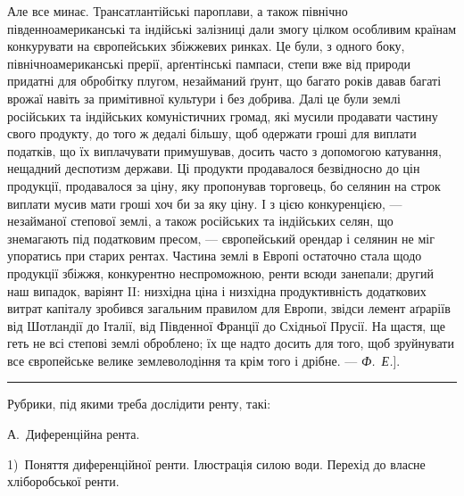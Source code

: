 Але все минає. Трансатлантійські пароплави, а також північно південноамериканські
та індійські залізниці дали змогу цілком особливим країнам конкурувати
на європейських збіжжевих ринках. Це були, з одного боку, північноамериканські
прерії, арґентінські пампаси, степи вже від природи придатні для
обробітку плугом, незайманий ґрунт, що багато років давав багаті врожаї навіть
за примітивної культури і без добрива. Далі це були землі російських та
індійських комуністичних громад, які мусили продавати частину свого продукту,
до того ж дедалі більшу, щоб одержати гроші для виплати податків, що їх виплачувати
примушував, досить часто з допомогою катування, нещадний деспотизм
держави. Ці продукти продавалося безвідносно до цін продукції, продавалося
за ціну, яку пропонував торговець, бо селянин на строк виплати мусив
мати гроші хоч би за яку ціну. І з цією конкуренцією, — незайманої степової
землі, а також російських та індійських селян, що знемагають під податковим пресом,
— європейський орендар і селянин не міг упоратись при старих рентах. Частина
землі в Европі остаточно стала щодо продукції збіжжя, конкурентно неспроможною,
ренти всюди занепали; другий наш випадок, варіянт II: низхідна ціна
і низхідна продуктивність додаткових витрат капіталу зробився загальним
правилом для Европи, звідси лемент аґраріїв від Шотландії до Італії, від Південної
Франції до Східньої Прусії. На щастя, ще геть не всі степові землі
оброблено; їх ще надто досить для того, щоб зруйнувати все європейське велике
землеволодіння та крім того і дрібне. — \emph{Ф.~Е.}].

\pfbreak

Рубрики, під якими треба дослідити ренту, такі:

А.~Диференційна рента.

1)~Поняття диференційної ренти. Ілюстрація силою води. Перехід до власне
хліборобської ренти.
